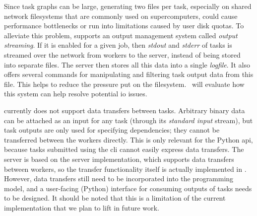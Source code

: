 Since task graphs can be large, generating two files per task, especially on shared network
filesystems that are commonly used on supercomputers, could cause performance bottlenecks or run
into limitations caused by user disk quotas. To alleviate this problem, \hq{}
supports an output management system called \emph{output streaming}. If it is enabled for a given
job, then \emph{stdout} and \emph{stderr} of tasks is streamed over the network
from workers to the server, instead of being stored into separate files. The server then stores all
this data into a single \emph{logfile}. It also offers several commands for manipulating
and filtering task output data from this file. This helps to reduce the pressure put on the
filesystem.~ will evaluate how this system can help resolve potential
\gls{io} issues.


%
%

\hyperqueue{} currently does not support data transfers between tasks. Arbitrary binary
data can be attached as an input for any task (through its \emph{standard input} stream), but
task outputs are only used for specifying dependencies; they cannot be transferred between the
workers directly. This is only relevant for the Python \gls{api}, because tasks
submitted using the \gls{cli} cannot easily express data transfers. The
\hq{} server is based on the \rsds{} server implementation, which
supports data transfers between workers, so the transfer functionality itself is actually
implemented in \hq{}. However, data transfers still need to be incorporated into
the \hyperqueue{} programming model, and a user-facing (Python) interface for consuming
outputs of tasks needs to be designed. It should be noted that this is a limitation of the current
implementation that we plan to lift in future work.

